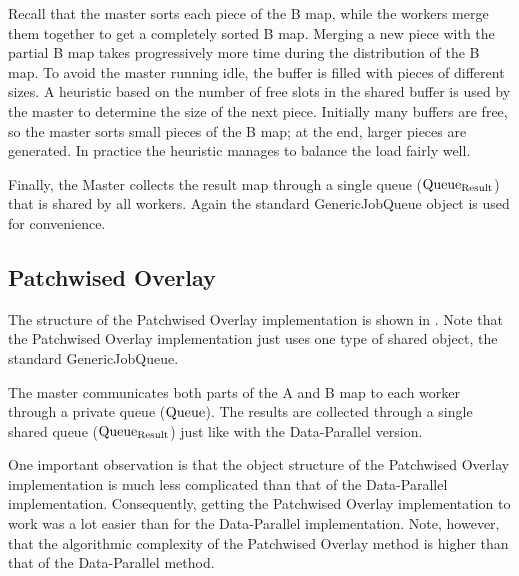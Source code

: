 Recall that the master sorts each piece of the B map, while the workers merge
them together to get a completely sorted B map. Merging a new piece with the
partial B map takes progressively more time during the distribution of the B
map. To avoid the master running idle, the buffer is filled with pieces of
different sizes. A heuristic based on the number of free slots in the shared
buffer is used by the master to determine the size of the next piece. Initially
many buffers are free, so the master sorts small pieces of the B map; at the
end, larger pieces are generated. In practice the heuristic manages to balance
the load fairly well.

Finally, the Master collects the result map through a single queue
($\rm{Queue_{Result}}$) that is shared by all workers. Again the standard
GenericJobQueue object is used for convenience.

\subsection{Patchwised Overlay}

The structure of the Patchwised Overlay implementation is shown in
.  Note that
the Patchwised Overlay implementation just uses one type of shared
object, the standard GenericJobQueue.

The master communicates both parts of the A and B map to each worker
through a private queue ($\rm{Queue}$). The results are collected
through a single shared queue ($\rm{Queue_{Result}}$) just like with
the Data-Parallel version.

\begin{figure}[hbtp]
  \begin{centering}
    \hspace{0cm}
  \end{centering}
\end{figure}

One important observation is that the object structure of the Patchwised
Overlay implementation is much less complicated than that of the
Data-Parallel implementation. Consequently, getting the Patchwised
Overlay implementation to work was a lot easier than for the
Data-Parallel implementation. Note, however, that the algorithmic
complexity of the Patchwised Overlay method is higher than that of the
Data-Parallel method.
